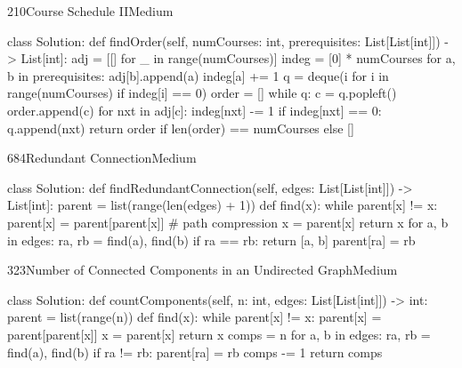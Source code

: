 \begin{problem}{210}{Course Schedule II}{Medium}
\begin{code}
class Solution:
    def findOrder(self, numCourses: int, prerequisites: List[List[int]]) -> List[int]:
        adj = [[] for _ in range(numCourses)]
        indeg = [0] * numCourses
        for a, b in prerequisites:
            adj[b].append(a)
            indeg[a] += 1
        q = deque(i for i in range(numCourses) if indeg[i] == 0)
        order = []
        while q:
            c = q.popleft()
            order.append(c)
            for nxt in adj[c]:
                indeg[nxt] -= 1
                if indeg[nxt] == 0:
                    q.append(nxt)
        return order if len(order) == numCourses else []
\end{code}
\end{problem}

\begin{problem}{684}{Redundant Connection}{Medium}
\begin{code}
class Solution:
    def findRedundantConnection(self, edges: List[List[int]]) -> List[int]:
        parent = list(range(len(edges) + 1))
        def find(x):
            while parent[x] != x:
                parent[x] = parent[parent[x]]   # path compression
                x = parent[x]
            return x
        for a, b in edges:
            ra, rb = find(a), find(b)
            if ra == rb:
                return [a, b]
            parent[ra] = rb
\end{code}
\end{problem}

\begin{problem}{323}{Number of Connected Components in an Undirected Graph}{Medium}
\begin{code}
class Solution:
    def countComponents(self, n: int, edges: List[List[int]]) -> int:
        parent = list(range(n))
        def find(x):
            while parent[x] != x:
                parent[x] = parent[parent[x]]
                x = parent[x]
            return x
        comps = n
        for a, b in edges:
            ra, rb = find(a), find(b)
            if ra != rb:
                parent[ra] = rb
                comps -= 1
        return comps
\end{code}
\end{problem}

